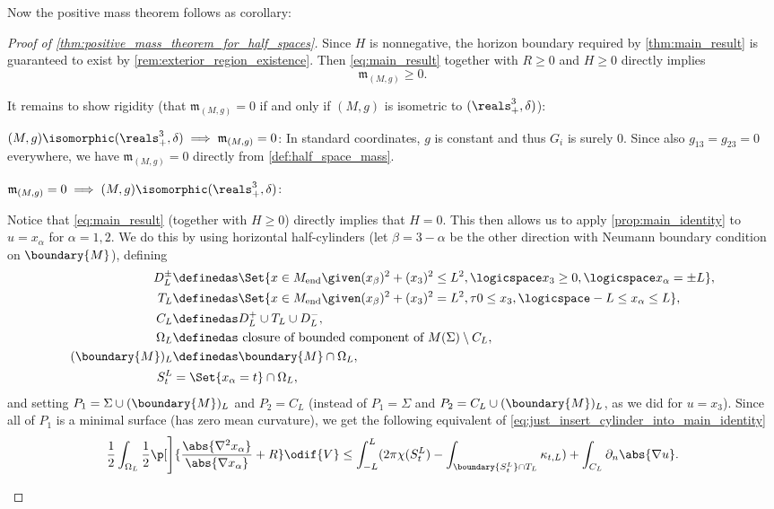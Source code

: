 \documentclass[titlepage,numbers=noenddot,headinclude,oneside,%
footinclude=true,cleardoublepage=empty,%
BCOR=5mm,paper=a4,fontsize=11pt,%
english,%
]{scrartcl}
\newcommand{\Mend}{M_{\mathrm{end}}} %
\newcommand{\mass}[2]{\mathfrak{m}_{(#1,#2)}} %
\begin{document}
Now the positive mass theorem follows as corollary:
\begin{proof}[Proof of \cref{thm:positive_mass_theorem_for_half_spaces}]
    Since \( H \) is nonnegative, the horizon boundary required by \cref{thm:main_result} is guaranteed to exist by \cref{rem:exterior_region_existence}. Then \cref{eq:main_result} together with \( R\geq 0 \) and \( H\geq 0 \) directly implies
    \begin{equation*}
        \mass{M}{g}\geq 0.
    \end{equation*}

    It remains to show rigidity (\ie that \( \mass{M}{g}=0 \) if and only if \( (M,g)\) is isometric to \( (\reals^3_{+},\delta) \)):
    \begin{proofdescription}
        \item{\( (M,g)\isomorphic(\reals^3_{+},\delta) \implies \mass{M}{g}=0   \):} In standard coordinates, \( g \) is constant and thus \( G_i \) is surely \( 0 \). Since also \( g_{13}=g_{23}=0 \) everywhere, we have \( \mass{M}{g}=0 \) directly from \cref{def:half_space_mass}. 
        \item{\(  \mass{M}{g}=0 \implies (M,g)\isomorphic(\reals^3_{+},\delta) \):} 

        Notice that \cref{eq:main_result} (together with \( H\geq 0 \)) directly implies that \( H=0 \). This then allows us to apply \cref{prop:main_identity} to \( u=x_{\alpha} \) for \( \alpha=1,2 \). We do this by using horizontal half-cylinders (let \( \beta=3-\alpha \) be the other direction with Neumann boundary condition on \( \boundary{M} \)), defining
        \begin{align*}
            D_L^{\pm}&\definedas\Set{x\in \Mend\given (x_\beta)^2+(x_3)^2\leq L^2,\logicspace x_3\geq 0,\logicspace x_\alpha=\pm L},\\
            T_L&\definedas\Set{x\in \Mend\given (x_\beta)^2+(x_3)^2=L^2,\tau 0\leq x_3,\logicspace -L\leq x_\alpha\leq L},\\
            C_L&\definedas D_L^+\cup T_L \cup D_L^-,\\
            \Omega_L&\definedas \text{ closure of bounded component of } M(\Sigma)\setminus C_L,\\
            (\boundary{M})_L&\definedas \boundary{M}\cap \Omega_L,\\
            S_t^L&=\Set{x_\alpha=t}\cap \Omega_L,
        \end{align*} 
        and setting \( P_1=\Sigma\cup (\boundary{M})_L \) and \( P_2=C_L \) (instead of \( P_1=\Sigma \) and \( P_2=C_L\cup (\boundary{M})_L \), as we did for \( u=x_3 \)). Since all of \( P_1 \) is a minimal surface (has zero mean curvature), we get the following equivalent of \cref{eq:just_insert_cylinder_into_main_identity}
        \begin{equation*}
            \frac{1}{2}\int_{\Omega_L}\frac{1}{2}\p[\Bigg]{\frac{\abs{\nabla^2 x_\alpha}}{\abs{\nabla x_\alpha}}+R}\odif{V}\leq \int_{-L}^L(2\pi \chi(S_t^L)-\int_{\boundary{S_t^L}\cap  T_L}\kappa_{t,L})+\int_{C_L} \partial_n \abs{\nabla u}.
        \end{equation*}


\end{proofdescription}
\end{proof}
\end{document}
